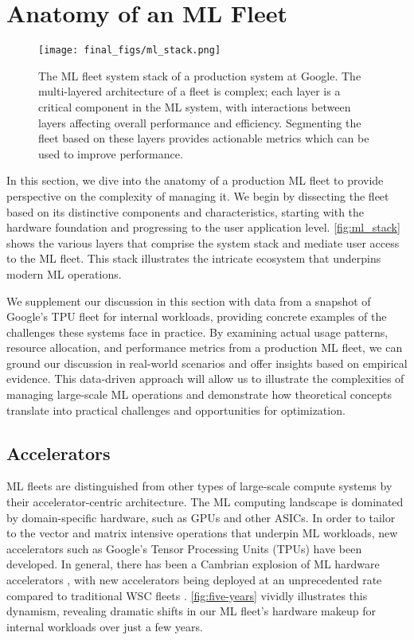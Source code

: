 \section{Anatomy of an ML Fleet}\label{sec:fleet}

\begin{figure}[t]
    \centering
    \texttt{[image: final\_figs/ml\_stack.png]}
    \caption{The ML fleet system stack of a production system at Google. The multi-layered architecture of a fleet is complex; each layer is a critical component in the ML system, with interactions between layers affecting overall performance and efficiency. Segmenting the fleet based on these layers provides actionable metrics which can be used to improve performance. }
    \label{fig:ml_stack}
\end{figure}
In this section, we dive into the anatomy of a production ML fleet to provide perspective on the complexity of managing it. We begin by dissecting the fleet based on its distinctive components and characteristics, starting with the hardware foundation and progressing to the user application level.  \autoref{fig:ml_stack} shows the various layers that comprise the system stack and mediate user access to the ML fleet. This stack illustrates the intricate ecosystem that underpins modern ML operations. 

We supplement our discussion in this section with data from a snapshot of Google's TPU fleet for internal workloads, providing concrete examples of the challenges these systems face in practice. By examining actual usage patterns, resource allocation, and performance metrics from a production ML fleet, we can ground our discussion in real-world scenarios and offer insights based on empirical evidence. This data-driven approach will allow us to illustrate the complexities of managing large-scale ML operations and demonstrate how theoretical concepts translate into practical challenges and opportunities for optimization. %
\subsection{Accelerators}


ML fleets are distinguished from other types of large-scale compute systems by their accelerator-centric architecture. The ML computing landscape is dominated by domain-specific hardware, such as GPUs and other ASICs. In order to tailor to the vector and matrix intensive operations that underpin ML workloads, new accelerators such as Google's Tensor Processing Units (TPUs) \cite{jouppi2018motivation} have been developed. In general, there has been a Cambrian explosion of ML hardware accelerators \cite{hennessy2019anewgoldenage}, with new accelerators being deployed at an unprecedented rate compared to traditional WSC fleets \cite{jouppi2021ten}. \autoref{fig:five-years} vividly illustrates this dynamism, revealing dramatic shifts in our ML fleet's hardware makeup for internal workloads over just a few years.


